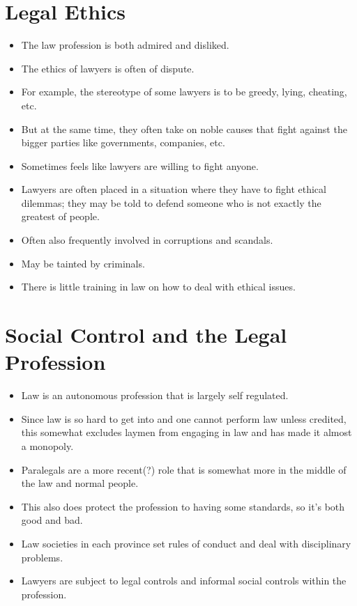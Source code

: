 \documentclass{article}
\begin{document}
\section{Legal Ethics}
\begin{itemize}
    \item The law profession is both admired and disliked.
    \item The ethics of lawyers is often of dispute.
    \item For example, the stereotype of some lawyers is to be greedy, lying, cheating, etc.
    \item But at the same time, they often take on noble causes that fight against the bigger parties like governments, companies, etc.
    \item Sometimes feels like lawyers are willing to fight anyone.
    \item Lawyers are often placed in a situation where they have to fight ethical dilemmas; they may be told to defend someone who is not exactly the greatest of people.
    \item Often also frequently involved in corruptions and scandals.
    \item May be tainted by criminals.
    \item There is little training in law on how to deal with ethical issues.
\end{itemize}

\section{Social Control and the Legal Profession}
\begin{itemize}
    \item Law is an autonomous profession that is largely self regulated.
    \item Since law is so hard to get into and one cannot perform law unless credited, this somewhat excludes laymen from engaging in law and has made it almost a monopoly.
    \item Paralegals are a more recent(?) role that is somewhat more in the middle of the law and normal people.
    \item This also does protect the profession to having some standards, so it's both good and bad.
    \item Law societies in each province set rules of conduct and deal with disciplinary problems.
    \item Lawyers are subject to legal controls and informal social controls within the profession.
\end{itemize}
\end{document}
